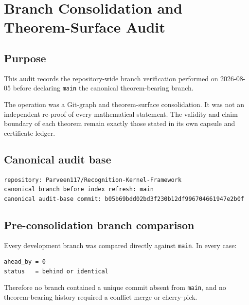 \hypertarget{branch-consolidation-and-theorem-surface-audit}{%
\chapter{Branch Consolidation and Theorem-Surface Audit}\label{branch-consolidation-and-theorem-surface-audit}}

\hypertarget{purpose}{%
\section{Purpose}\label{purpose}}

This audit records the repository-wide branch verification performed on 2026-08-05 before declaring \texttt{main} the canonical theorem-bearing branch.

The operation was a Git-graph and theorem-surface consolidation. It was not an independent re-proof of every mathematical statement. The validity and claim boundary of each theorem remain exactly those stated in its own capsule and certificate ledger.

\hypertarget{canonical-audit-base}{%
\section{Canonical audit base}\label{canonical-audit-base}}

\begin{verbatim}
repository: Parveen117/Recognition-Kernel-Framework
canonical branch before index refresh: main
canonical audit-base commit: b05b69bdd02bd3f230b12df996704661947e2b0f
\end{verbatim}

\hypertarget{pre-consolidation-branch-comparison}{%
\section{Pre-consolidation branch comparison}\label{pre-consolidation-branch-comparison}}

Every development branch was compared directly against \texttt{main}. In every case:

\begin{verbatim}
ahead_by = 0
status   = behind or identical
\end{verbatim}

Therefore no branch contained a unique commit absent from \texttt{main}, and no theorem-bearing history required a conflict merge or cherry-pick.

